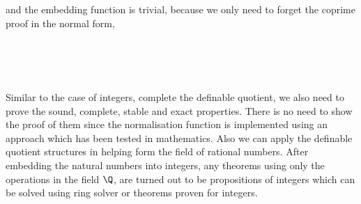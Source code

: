 and the embedding function is trivial, because we only need to forget
the coprime proof in the normal form,

\begin{code}
\\
\> \AgdaSymbol{:}   \<%
\\
\>   \AgdaSymbol{=} \AgdaSymbol{(} \AgdaSymbol{(} \AgdaSymbol{))}  \AgdaSymbol{(} \AgdaSymbol{)}\<%
\\
\end{code}

Similar to the case of integers, complete the definable quotient, we
also need to prove the sound, complete, stable and exact
properties. There is no need to show the proof of them since the
normalisation function is implemented using an approach which has been
tested in mathematics.
Also we can apply the definable quotient structures in helping form
the field of rational numbers. After embedding the natural numbers
into integers, any theorems using only the operations in the field
$\Q$, are turned out to be propositions of integers which can be
solved using ring solver or theorems proven for integers.


